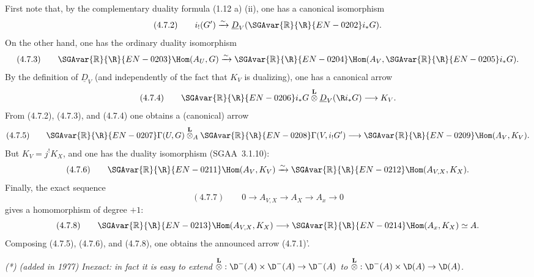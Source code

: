 First note that, by the complementary duality formula (1.12 a) (ii), one has a canonical isomorphism
\[
(4.7.2)\qquad i_!(G')\xrightarrow{\sim}\underline{D}_V(\SGAvar{\mathbb{R}}{\R}{EN-0202} i_*G).
\]
On the other hand, one has the ordinary duality isomorphism
\[
(4.7.3)\qquad \SGAvar{\mathbb{R}}{\R}{EN-0203}\Hom(A_U,G)\xrightarrow{\sim}\SGAvar{\mathbb{R}}{\R}{EN-0204}\Hom(A_V,\SGAvar{\mathbb{R}}{\R}{EN-0205} i_*G).
\]
By the definition of $\underline{D}_V$ (and independently of the fact that $K_V$ is dualizing), one has a canonical arrow
\[
(4.7.4)\qquad \SGAvar{\mathbb{R}}{\R}{EN-0206} i_*G\overset{\mathbf L}{\otimes}\underline{D}_V(\R i_*G)\longrightarrow K_V.
\]
From (4.7.2), (4.7.3), and (4.7.4) one obtains a (canonical) arrow
\[
(4.7.5)\qquad \SGAvar{\mathbb{R}}{\R}{EN-0207}\Gamma(U,G)\overset{\mathbf L}{\otimes}_A\SGAvar{\mathbb{R}}{\R}{EN-0208}\Gamma(V,i_!G')\longrightarrow \SGAvar{\mathbb{R}}{\R}{EN-0209}\Hom(A_V,K_V).
\]
But $K_V=j^!K_X$, and one has the duality isomorphism (SGAA~3.1.10):
\[
(4.7.6)\qquad \SGAvar{\mathbb{R}}{\R}{EN-0211}\Hom(A_V,K_V)\xrightarrow{\sim}\SGAvar{\mathbb{R}}{\R}{EN-0212}\Hom(A_{V,X},K_X).
\]
Finally, the exact sequence
\[
(4.7.7)\qquad 0\longrightarrow A_{V,X}\longrightarrow A_X\longrightarrow A_x\longrightarrow 0
\]
gives a homomorphism of degree $+1$:
\[
(4.7.8)\qquad \SGAvar{\mathbb{R}}{\R}{EN-0213}\Hom(A_{V,X},K_X)\longrightarrow \SGAvar{\mathbb{R}}{\R}{EN-0214}\Hom(A_x,K_X)\simeq A.
\]
Composing (4.7.5), (4.7.6), and (4.7.8), one obtains the announced arrow (4.7.1)'.

\emph{(*) (added in 1977) Inexact: in fact it is easy to extend $\overset{\mathbf L}{\otimes}:\D^-(A)\times\D^-(A)\to\D^-(A)$ to $\overset{\mathbf L}{\otimes}:\D^-(A)\times\D(A)\to\D(A)$.}


